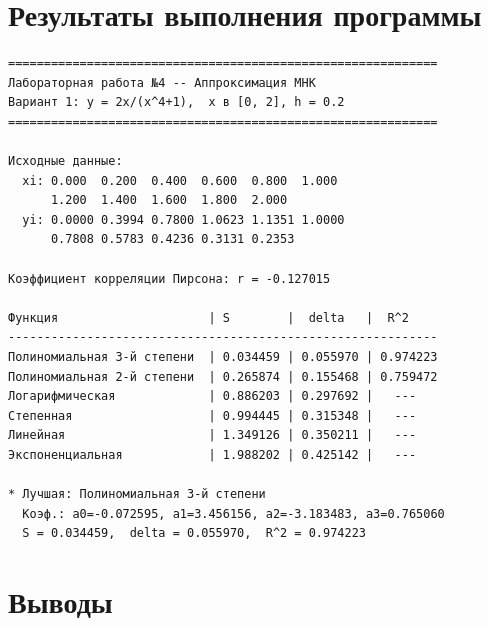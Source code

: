 \documentclass[12pt,a4paper]{article}
\begin{document}
\section{Результаты выполнения программы}

\begin{verbatim}
============================================================
Лабораторная работа №4 -- Аппроксимация МНК
Вариант 1: y = 2x/(x^4+1),  x в [0, 2], h = 0.2
============================================================

Исходные данные:
  xi: 0.000  0.200  0.400  0.600  0.800  1.000
      1.200  1.400  1.600  1.800  2.000
  yi: 0.0000 0.3994 0.7800 1.0623 1.1351 1.0000
      0.7808 0.5783 0.4236 0.3131 0.2353

Коэффициент корреляции Пирсона: r = -0.127015

Функция                     | S        |  delta   |  R^2
------------------------------------------------------------
Полиномиальная 3-й степени  | 0.034459 | 0.055970 | 0.974223
Полиномиальная 2-й степени  | 0.265874 | 0.155468 | 0.759472
Логарифмическая             | 0.886203 | 0.297692 |   ---
Степенная                   | 0.994445 | 0.315348 |   ---
Линейная                    | 1.349126 | 0.350211 |   ---
Экспоненциальная            | 1.988202 | 0.425142 |   ---

* Лучшая: Полиномиальная 3-й степени
  Коэф.: a0=-0.072595, a1=3.456156, a2=-3.183483, a3=0.765060
  S = 0.034459,  delta = 0.055970,  R^2 = 0.974223
\end{verbatim}

\section{Выводы}
\end{document}
